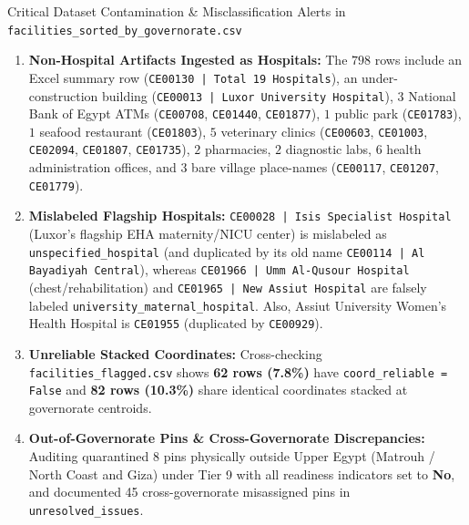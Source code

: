 \documentclass[10pt,a4paper]{article}
\begin{document}
\begin{alertbox}{Critical Dataset Contamination \& Misclassification Alerts in \texttt{facilities\_sorted\_by\_governorate.csv}}
\begin{enumerate}
    \item \textbf{Non-Hospital Artifacts Ingested as Hospitals:} The $798$ rows include an Excel summary row (\texttt{CE00130 | Total 19 Hospitals}), an under-construction building (\texttt{CE00013 | Luxor University Hospital}), $3$ National Bank of Egypt ATMs (\texttt{CE00708}, \texttt{CE01440}, \texttt{CE01877}), $1$ public park (\texttt{CE01783}), $1$ seafood restaurant (\texttt{CE01803}), $5$ veterinary clinics (\texttt{CE00603}, \texttt{CE01003}, \texttt{CE02094}, \texttt{CE01807}, \texttt{CE01735}), $2$ pharmacies, $2$ diagnostic labs, $6$ health administration offices, and $3$ bare village place-names (\texttt{CE00117}, \texttt{CE01207}, \texttt{CE01779}).
    \item \textbf{Mislabeled Flagship Hospitals:} \texttt{CE00028 | Isis Specialist Hospital} (Luxor's flagship EHA maternity/NICU center) is mislabeled as \texttt{unspecified\_hospital} (and duplicated by its old name \texttt{CE00114 | Al Bayadiyah Central}), whereas \texttt{CE01966 | Umm Al-Qusour Hospital} (chest/rehabilitation) and \texttt{CE01965 | New Assiut Hospital} are falsely labeled \texttt{university\_maternal\_hospital}. Also, Assiut University Women's Health Hospital is \texttt{CE01955} (duplicated by \texttt{CE00929}).
    \item \textbf{Unreliable Stacked Coordinates:} Cross-checking \texttt{facilities\_flagged.csv} shows \textbf{62 rows (7.8\%)} have \texttt{coord\_reliable = False} and \textbf{82 rows (10.3\%)} share identical coordinates stacked at governorate centroids.
    \item \textbf{Out-of-Governorate Pins \& Cross-Governorate Discrepancies:} Auditing quarantined 8 pins physically outside Upper Egypt (Matrouh / North Coast and Giza) under Tier 9 with all readiness indicators set to \textbf{No}, and documented 45 cross-governorate misassigned pins in \texttt{unresolved\_issues}.
\end{enumerate}
\end{alertbox}
\end{document}
